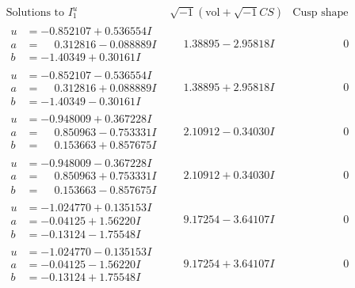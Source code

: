 \documentclass[1p]{elsarticle_modified}
\theoremstyle{definition}
\newcommand{\I}{\sqrt{-1}}
\begin{document}
$$\begin{array}{c|c|c}  
\text{Solutions to }I^u_{1}& \I (\text{vol} + \sqrt{-1}CS) & \text{Cusp shape}\\
 \hline 
\begin{aligned}
u &= -0.852107 + 0.536554 I \\
a &= \phantom{-}0.312816 - 0.088889 I \\
b &= -1.40349 + 0.30161 I\end{aligned}
 & \phantom{-}1.38895 - 2.95818 I & \phantom{-0.000000 } 0 \\ \hline\begin{aligned}
u &= -0.852107 - 0.536554 I \\
a &= \phantom{-}0.312816 + 0.088889 I \\
b &= -1.40349 - 0.30161 I\end{aligned}
 & \phantom{-}1.38895 + 2.95818 I & \phantom{-0.000000 } 0 \\ \hline\begin{aligned}
u &= -0.948009 + 0.367228 I \\
a &= \phantom{-}0.850963 - 0.753331 I \\
b &= \phantom{-}0.153663 + 0.857675 I\end{aligned}
 & \phantom{-}2.10912 - 0.34030 I & \phantom{-0.000000 } 0 \\ \hline\begin{aligned}
u &= -0.948009 - 0.367228 I \\
a &= \phantom{-}0.850963 + 0.753331 I \\
b &= \phantom{-}0.153663 - 0.857675 I\end{aligned}
 & \phantom{-}2.10912 + 0.34030 I & \phantom{-0.000000 } 0 \\ \hline\begin{aligned}
u &= -1.024770 + 0.135153 I \\
a &= -0.04125 + 1.56220 I \\
b &= -0.13124 - 1.75548 I\end{aligned}
 & \phantom{-}9.17254 - 3.64107 I & \phantom{-0.000000 } 0 \\ \hline\begin{aligned}
u &= -1.024770 - 0.135153 I \\
a &= -0.04125 - 1.56220 I \\
b &= -0.13124 + 1.75548 I\end{aligned}
 & \phantom{-}9.17254 + 3.64107 I & \phantom{-0.000000 } 0 \\ \hline\begin{aligned}

\end{aligned}
\end{array}$$
\end{document}
